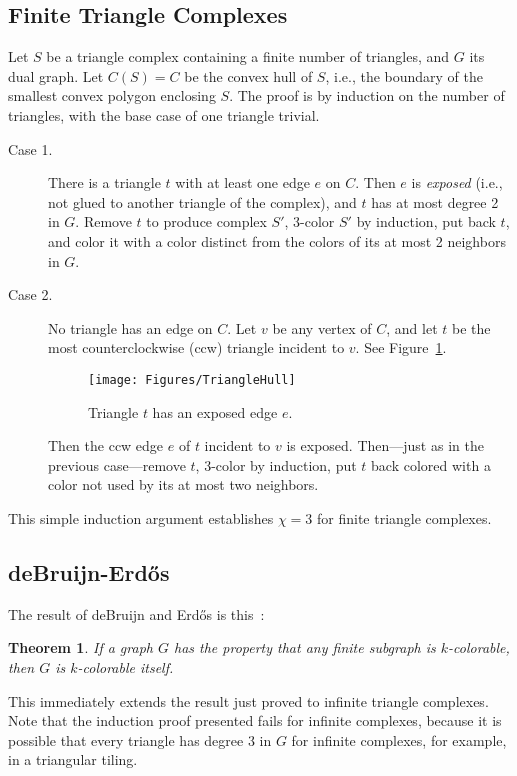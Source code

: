 \pdfoutput=1  \documentclass[]{article}
\newtheorem{theorem}{{\bf Theorem}}
\newcommand{\thmlab}[1]{\label{thm:#1}}
\newcommand{\figlab}[1]{\label{fig:#1}}
\newcommand{\figref}[1]{\ref{fig:#1}}
\def\c{{\chi}}
\begin{document}
\subsection{Finite Triangle Complexes}
Let $S$ be a triangle complex containing a finite number of triangles,
and $G$ its dual graph.
Let $C(S)=C$ be the convex hull of $S$, i.e., the boundary of the
smallest
convex polygon enclosing $S$.
The proof is by induction on the number of triangles, with
the base case of one triangle trivial.
\begin{description}
\item[Case 1.] There is a triangle $t$ with at least one edge $e$ on
  $C$.
Then $e$ is \emph{exposed}
(i.e., not glued to another
triangle of the complex),
and $t$ has at most degree 2 in $G$.
Remove $t$ to produce complex $S'$, 3-color $S'$ by induction,
put back $t$, and color it with a color distinct from the colors of
its
at most 2 neighbors in $G$.
\item[Case 2.] No triangle has an edge on $C$.  Let $v$ be any vertex
  of $C$, and let $t$ be the most counterclockwise (ccw) triangle incident
  to $v$.
See Figure~\figref{TriangleHull}.
\begin{figure}[htbp]
\centering
\texttt{[image: Figures/TriangleHull]}
\caption{Triangle $t$ has an exposed edge $e$.}
\figlab{TriangleHull}
\end{figure}
Then the ccw edge $e$ of $t$ incident to $v$ is exposed.
Then---just as in the previous case---remove
$t$,
3-color by induction, put $t$ back colored with a color not used by
its
at most two neighbors.
\end{description}
This simple induction argument establishes $\c=3$ for finite triangle complexes.

\subsection{deBruijn-Erd\H{o}s}

The result of deBruijn and  Erd\H{o}s is this~\cite{ed-cpigp-51}:
\begin{theorem}
If a graph $G$ has the property that any finite subgraph is
$k$-colorable,
then $G$ is $k$-colorable itself.
\thmlab{deB-E}
\end{theorem}


This immediately extends the result just proved to infinite triangle
complexes.
Note that the induction proof presented fails for infinite complexes, 
because it is possible that every
triangle
has degree 3 in $G$ for infinite complexes,
for example, in a triangular tiling.
\end{document}
